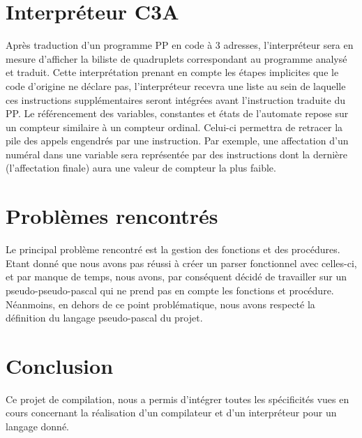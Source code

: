 \documentclass[11pt,a4paper]{article}
\begin{document}
\section{Interpréteur C3A}
Après traduction d'un programme PP en code à 3 adresses, l'interpréteur sera en mesure d'afficher la biliste de quadruplets correspondant au programme analysé et traduit.
Cette interprétation prenant en compte les étapes implicites que le code d'origine ne déclare pas, l'interpréteur recevra une liste au sein de laquelle ces instructions supplémentaires seront intégrées avant l'instruction traduite du PP.
Le référencement des variables, constantes et états de l'automate repose sur un compteur similaire à un compteur ordinal.
Celui-ci permettra de retracer la pile des appels engendrés par une instruction.
Par exemple, une affectation d'un numéral dans une variable sera représentée par des instructions dont la dernière (l'affectation finale) aura une valeur de compteur la plus faible.
\pagebreak
\section{Problèmes rencontrés}
Le principal problème rencontré est la gestion des fonctions et des procédures. Etant donné que nous avons pas réussi à créer un parser fonctionnel avec celles-ci, et par manque de temps, nous avons, par conséquent décidé de travailler sur un \og pseudo-pseudo-pascal \fg{} qui ne prend pas en compte les fonctions et procédure. Néanmoins, en dehors de ce point problématique, nous avons respecté la définition du langage pseudo-pascal du projet.
\pagebreak
\section{Conclusion}

Ce projet de compilation, nous a permis d'intégrer toutes les spécificités vues en cours concernant la réalisation d'un compilateur et d'un interpréteur pour un langage donné. 
\end{document}
